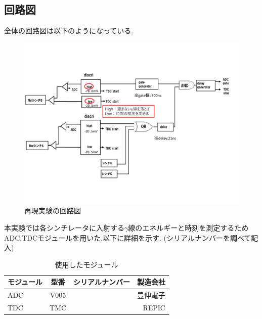 \subsection{回路図}
全体の回路図は以下のようになっている.
\begin{figure}[H]
	\begin{center}
		\includegraphics[width=15cm]{fig/isb/circuit.pdf}
		\caption{再現実験の回路図}
		\label{fig:circuit2015}
	\end{center}
\end{figure}

本実験では各シンチレータに入射する$\gamma$線のエネルギーと時刻を測定するためADC,TDCモジュールを用いた.以下に詳細を示す.
(シリアルナンバーを調べて記入)
\begin{table}[htbp]
	\begin{center}
		\caption{使用したモジュール}
		\begin{tabular}{|l|c|r|r|} \hline
			モジュール & 型番 & シリアルナンバー & 製造会社 \\ \hline \hline
			ADC & V005 & & 豊伸電子 \\ \hline
			TDC & TMC & & REPIC \\ \hline
		\end{tabular}
		\label{module}
	\end{center}
\end{table}

